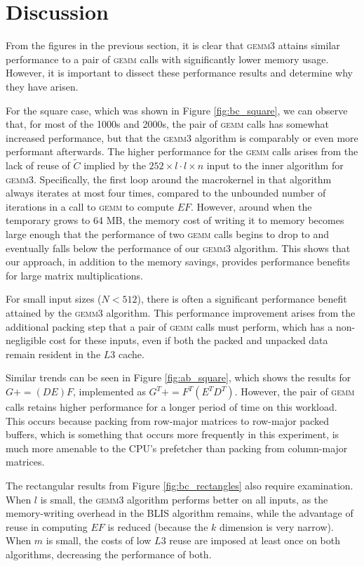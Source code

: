 \documentclass[12pt]{article}
\newcommand*{\pluseq}{\mathrel{{+}{=}}}
\newcommand*{\gemmt}{{\textsc{gemm3}}}
\newcommand*{\gemm}{{\textsc{gemm}}}
\begin{document}
\section{Discussion}
From the figures in the previous section, it is clear that \gemmt{} attains similar performance to a pair of \gemm{} calls with significantly lower memory usage.
However, it is important to dissect these performance results and determine why they have arisen.

For the square case, which was shown in Figure \ref{fig:bc_square}, we can observe that, for most of the 1000s and 2000s, the pair of \gemm{} calls has somewhat increased performance, but that the \gemmt{} algorithm is comparably or even more performant afterwards.
The higher performance for the \gemm{} calls arises from the lack of reuse of $\widetilde{C}$ implied by the $252 \times l \cdot l \times n$ input to the inner algorithm for \gemmt{}.
Specifically, the first loop around the macrokernel in that algorithm always iterates at most four times, compared to the unbounded number of iterations in a call to \gemm{} to compute $EF$.
However, around when the temporary grows to 64 MB, the memory cost of writing it to memory becomes large enough that the performance of two \gemm{} calls begins to drop to and eventually falls below the performance of our \gemmt{} algorithm.
This shows that our approach, in addition to the memory savings, provides performance benefits for large matrix multiplications.

For small input sizes ($N < 512$), there is often a significant performance benefit attained by the \gemmt{} algorithm.
This performance improvement arises from the additional packing step that a pair of \gemm{} calls must perform, which has a non-negligible cost for these inputs, even if both the packed and unpacked data remain resident in the $L3$ cache.

Similar trends can be seen in Figure \ref{fig:ab_square}, which shows the results for $G \pluseq (DE)F$, implemented as $G^T \pluseq F^T(E^TD^T)$.
However, the pair of \gemm{} calls retains higher performance for a longer period of time on this workload.
This occurs because packing from row-major matrices to row-major packed buffers, which is something that occurs more frequently in this experiment, is much more amenable to the CPU's prefetcher than packing from column-major matrices.

The rectangular results from Figure \ref{fig:bc_rectangles} also require examination.
When $l$ is small, the \gemmt{} algorithm performs better on all inputs, as the memory-writing overhead in the BLIS algorithm remains, while the advantage of reuse in computing $EF$ is reduced (because the $k$ dimension is very narrow).
When $m$ is small, the costs of low $L3$ reuse are imposed at least once on both algorithms, decreasing the performance of both.
\end{document}
